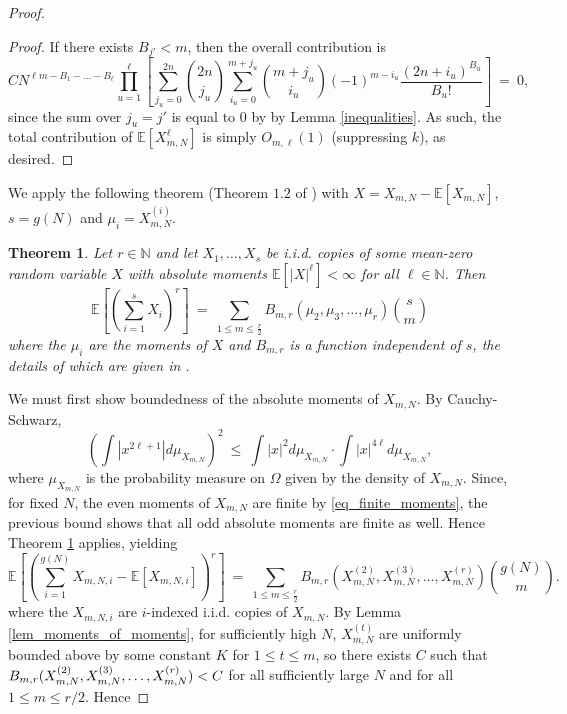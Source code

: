 \documentclass[11pt,reqno]{amsart}
\numberwithin{equation}{section}
\newtheorem{thm}{Theorem}[section]
\theoremstyle{plain}
\newcommand{\B}{\mathcal{B}}
\newcommand{\N}{\mathbb{N}}
\newcommand{\E}[1]{\mathbb{E}[#1]}
\begin{document}
\begin{proof}
\begin{proof}
If there exists $B_{j'}<m$, then the overall contribution is
\begin{equation}
CN^{\ell m-B_1-\dots-B_\ell} \prod_{u=1}^\ell \left[\sum_{j_u=0}^{2n} \binom{2n}{j_u} \sum_{i_u=0}^{m+j_u} \binom{m+j_u}{i_u}(-1)^{m-i_u}\frac{(2n+i_u)^{B_u}}{B_u!}\right]\ = \ 0,
\end{equation}
since the sum over $j_u=j'$ is equal to 0 by by Lemma \ref{inequalities}. As such, the total contribution of $\E{X_{m,N}^\ell}$ is simply $O_{m,\ell}(1)$ (suppressing $k$), as desired.
\end{proof}

We apply the following theorem (Theorem $1.2$ of \cite{Fer}) with $X=X_{m,N}-\E{X_{m,N}}$, $s=g(N)$ and $\mu_i=X_{m,N}^{(i)}$.

\begin{thm}\label{thm_turkishguy}
Let $r \in \N$ and let $X_1,\ldots,X_s$ be i.i.d. copies of some mean-zero random variable $X$ with absolute moments $\E{|X|^\ell}<\infty$ for all $\ell \in \N$. Then
\begin{equation}
\mathbb{E}\left[ \left( \sum_{i=1}^s X_i\right)^r \right]\ =\ \sum_{1 \leq m \leq \frac{r}{2}}B_{m,r}(\mu_2,\mu_3,\ldots,\mu_r) \binom{s}{m}
\end{equation}
where the $\mu_i$ are the moments of $X$ and $B_{m,r}$ is a function independent of $s$, the details of which are given in \cite{Fer}.
\end{thm}
We must first show boundedness of the absolute moments of $X_{m,N}$. By Cauchy-Schwarz,
\begin{equation}
\left(\int |x^{2\ell+1}|d\mu_{X_{m,N}}\right)^2\ \leq\ \int |x|^2 d\mu_{X_{m,N}} \cdot \int |x|^{4\ell}d\mu_{X_{m,N}},
\end{equation}
where $\mu_{X_{m,N}}$ is the probability measure on $\Omega$ given by the density of $X_{m,N}$. Since, for fixed $N$, the even moments of $X_{m,N}$ are finite by \eqref{eq_finite_moments}, the previous bound shows that all odd absolute moments are finite as well. Hence Theorem \ref{thm_turkishguy} applies, yielding
\begin{equation}
\mathbb{E}\left[\left(\sum_{i=1}^{g(N)} X_{m,N,i}-\E{X_{m,N,i}}\right)^r\right]\ =\ \sum_{1 \leq m \leq \frac{r}{2}}B_{m,r}(X_{m,N}^{(2)},X_{m,N}^{(3)},\ldots,X_{m,N}^{(r)}) \binom{g(N)}{m}.
\end{equation}
where the $X_{m,N,i}$ are $i$-indexed i.i.d. copies of $X_{m,N}$. By Lemma \ref{lem_moments_of_moments}, for sufficiently high $N$, $X_{m,N}^{(t)}$ are uniformly bounded above by some constant $K$ for $1 \leq t \leq m$, so there exists $C$ such that $\\B_{m,r}(X_{m,N}^{(2)},X_{m,N}^{(3)},\ldots,X_{m,N}^{(r)}) < C$ for all sufficiently large $N$ and for all $1\leq m \leq r/2$. Hence

\end{proof}
\end{document}
